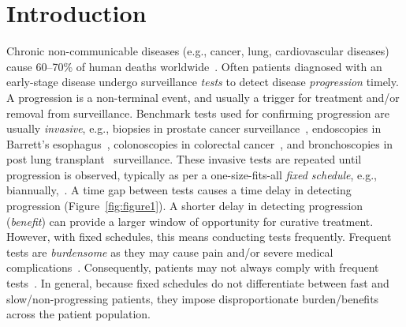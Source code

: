 \documentclass[AMA,STIX1COL]{WileyNJD-v2}
\begin{document}


\maketitle



\section{Introduction}
\label{sec:introduction}
Chronic non-communicable diseases (e.g., cancer, lung, cardiovascular diseases) cause 60--70\% of human deaths worldwide~\citep{world2014global}. Often patients diagnosed with an early-stage disease undergo surveillance \emph{tests} to detect disease \emph{progression} timely. A progression is a non-terminal event, and usually a trigger for treatment and/or removal from surveillance. Benchmark tests used for confirming progression are usually \emph{invasive}, e.g., biopsies in prostate cancer surveillance~\citep{bokhorst2015compliance}, endoscopies in Barrett's esophagus~\citep{weusten2017endoscopic}, colonoscopies in colorectal cancer~\citep{krist2007timing}, and bronchoscopies in post lung transplant~\citep{mcwilliams2008surveillance} surveillance. These invasive tests are repeated until progression is observed, typically as per a one-size-fits-all \emph{fixed schedule}, e.g., biannually,~\citep{krist2007timing,mcwilliams2008surveillance,bokhorst2015compliance}. A time gap between tests causes a time delay in detecting progression (Figure~\ref{fig:figure1}). A shorter delay in detecting progression (\emph{benefit}) can provide a larger window of opportunity for curative treatment. However, with fixed schedules, this means conducting tests frequently. Frequent tests are \textit{burdensome} as they may cause pain and/or severe medical complications~\citep{krist2007timing,loeb2013systematic}. Consequently, patients may not always comply with frequent tests~\citep{bokhorst2015compliance, LeClercq2015325}. In general, because fixed schedules do not differentiate between fast and slow/non-progressing patients, they impose disproportionate burden/benefits across the patient population.
\end{document}
